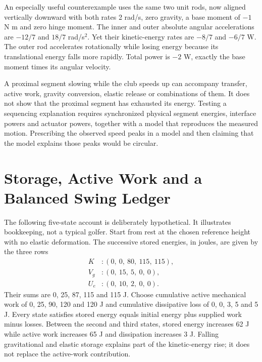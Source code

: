 An especially useful counterexample uses the same two unit rods, now aligned
vertically downward with both rates 2 rad/s, zero gravity, a base moment of
$-1$ N m and zero hinge moment. The inner and outer absolute angular
accelerations are $-12/7$ and $18/7$ rad/s$^2$. Yet their kinetic-energy rates
are $-8/7$ and $-6/7$ W. The outer rod accelerates rotationally while losing
energy because its translational energy falls more rapidly. Total power is
$-2$ W, exactly the base moment times its angular velocity.

A proximal segment slowing while the club speeds up can accompany transfer,
active work, gravity conversion, elastic release or combinations of them.
It does not show that the proximal segment has exhausted its energy. Testing a
sequencing explanation requires synchronized physical segment energies,
interface powers and actuator powers, together with a model that reproduces
the measured motion. Prescribing the observed speed peaks in a model and then
claiming that the model explains those peaks would be circular.

\section[Storage, Active Work and a Balanced Swing Ledger]{Storage, Active Work and a\\Balanced Swing Ledger}
\label{sec:energy_storage_release}

The following five-state account is deliberately hypothetical. It illustrates
bookkeeping, not a typical golfer. Start from rest at the chosen reference
height with no elastic deformation. The successive stored energies, in joules,
are given by the three rows
\begin{equation}
\begin{aligned}
K &: (0,\ 0,\ 80,\ 115,\ 115),\\
V_g &: (0,\ 15,\ 5,\ 0,\ 0),\\
U_e &: (0,\ 10,\ 2,\ 0,\ 0).
\end{aligned}
\label{eq:energy_storage_ledger}
\end{equation}
Their sums are 0, 25, 87, 115 and 115 J. Choose cumulative active mechanical
work of 0, 25, 90, 120 and 120 J and cumulative dissipative loss of 0, 0, 3, 5
and 5 J. Every state satisfies stored energy equals initial energy plus supplied
work minus losses. Between the second and third states, stored energy increases
62 J while active work increases 65 J and dissipation increases 3 J. Falling
gravitational and elastic storage explains part of the kinetic-energy rise;
it does not replace the active-work contribution.

